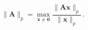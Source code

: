 \[\|\mathbf{A}\|_{p}=\max_{\mathbf{x}\neq\boldsymbol{{0}}}\frac{\|\mathbf{A}%
\mathbf{x}\|_{p}}{\|\mathbf{x}\|_{p}}\,.\]